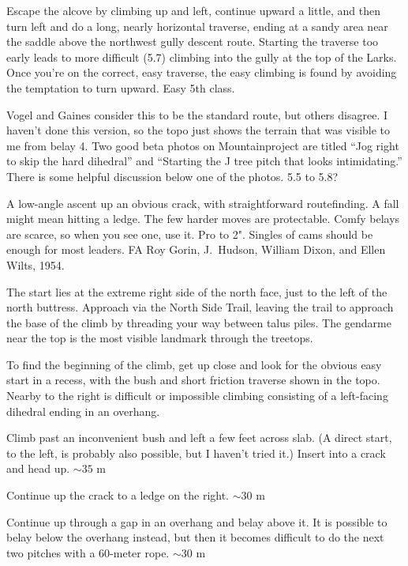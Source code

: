 \documentclass{tahquitz}
\begin{document}
 Escape the alcove by climbing up and left, continue upward a little, and
then turn left and do a long, nearly
horizontal traverse, ending at a sandy area near the saddle above the northwest gully
descent route. Starting the traverse too early leads to more difficult (5.7) climbing
into the gully at the top of the Larks. Once you're on the correct, easy traverse,
the easy climbing is found by avoiding the temptation to turn upward.  Easy 5th class.

 Vogel and Gaines consider this to be the standard route, but others disagree.
I haven't done this version, so the topo just shows the terrain that was visible
to me from belay 4. Two good beta
photos on Mountainproject are titled ``Jog right to skip the hard dihedral''
and ``Starting the J tree pitch that looks intimidating.''
There is some helpful discussion below one of the photos. 5.5 to 5.8?




A low-angle ascent up an obvious crack, with straightforward routefinding.
A fall might mean hitting a ledge. The few harder moves
are protectable. Comfy belays are scarce, so when you see one, use
it. Pro to 2". Singles of cams should be enough for most leaders.
FA Roy Gorin, J.~Hudson, William Dixon, and Ellen Wilts, 1954.

The start lies at  the extreme right side of the north face, just to
the left of the north buttress. Approach via the North Side Trail,
leaving the trail to approach the base of the climb by threading your
way between talus piles. The gendarme near the top is the most
visible landmark through the treetops.

To find the beginning of the climb, get up close and look for the
obvious easy start in a recess, with the bush and short friction
traverse shown in the topo. Nearby to the right is difficult or
impossible climbing consisting of a left-facing dihedral ending in an
overhang. 

 Climb past an inconvenient bush and left a few feet across slab.
(A direct start, to the left, is probably also possible, but I haven't tried it.)
Insert into a crack and head up. $\sim 35$ m

 Continue up the crack to a ledge on the right.  $\sim 30$ m

 Continue up through a gap in an overhang and belay above it.
It is possible to belay below the overhang instead, but then it becomes
difficult to do the next two pitches with a 60-meter rope. $\sim 30$ m
\end{document}
